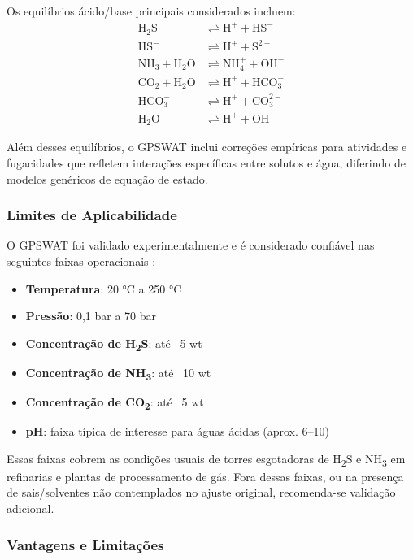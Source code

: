 \documentclass[10pt,a4paper]{article}
\begin{document}
Os equilíbrios ácido/base principais considerados incluem:
\begin{align}
\text{H}_2\text{S} &\rightleftharpoons \text{H}^+ + \text{HS}^- \\
\text{HS}^- &\rightleftharpoons \text{H}^+ + \text{S}^{2-} \\
\text{NH}_3 + \text{H}_2\text{O} &\rightleftharpoons \text{NH}_4^+ + \text{OH}^- \\
\text{CO}_2 + \text{H}_2\text{O} &\rightleftharpoons \text{H}^+ + \text{HCO}_3^- \\
\text{HCO}_3^- &\rightleftharpoons \text{H}^+ + \text{CO}_3^{2-} \\
\text{H}_2\text{O} &\rightleftharpoons \text{H}^+ + \text{OH}^-
\end{align}

Além desses equilíbrios, o GPSWAT inclui correções empíricas para atividades e fugacidades que refletem interações específicas entre solutos e água, diferindo de modelos genéricos de equação de estado.

\subsubsection{Limites de Aplicabilidade}

O GPSWAT foi validado experimentalmente e é considerado confiável nas seguintes faixas operacionais \cite{kohl1997}:

\begin{itemize}[leftmargin=4em, itemsep=0pt]
  \item \textbf{Temperatura}: 20 °C a 250 °C
  \item \textbf{Pressão}: 0,1 bar a 70 bar
  \item \textbf{Concentração de H\textsubscript{2}S}: até ~5 wt%
  \item \textbf{Concentração de NH\textsubscript{3}}: até ~10 wt%
  \item \textbf{Concentração de CO\textsubscript{2}}: até ~5 wt%
  \item \textbf{pH}: faixa típica de interesse para águas ácidas (aprox. 6–10)
\end{itemize}

Essas faixas cobrem as condições usuais de torres esgotadoras de H\textsubscript{2}S e NH\textsubscript{3} em refinarias e plantas de processamento de gás. Fora dessas faixas, ou na presença de sais/solventes não contemplados no ajuste original, recomenda-se validação adicional.

\subsubsection{Vantagens e Limitações}
\end{document}
